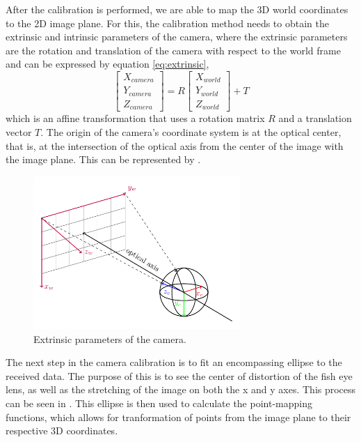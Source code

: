 After the calibration is performed, we are able to map the 3D world coordinates to the 2D image plane. For this, the calibration method needs to obtain the extrinsic
and intrinsic parameters of the camera, where the extrinsic parameters are the rotation and translation of the camera with respect to the world frame and can be expressed by equation \ref{eq:extrinsic},
\begin{equation}
	\begin{bmatrix}
		X_{camera} \\
		Y_{camera} \\
		Z_{camera}
	\end{bmatrix}
	= R 
  \begin{bmatrix}
	X_{world} \\
	Y_{world} \\
	Z_{world}
  \end{bmatrix}
  + T
  \label{eq:extrinsic}
\end{equation}
which is an affine transformation that uses a rotation matrix $R$ and a translation vector $T$. The origin of the camera's coordinate system is at the optical center,
that is, at the intersection of the optical axis from the center of the image with the image plane. This can be represented by .

\begin{figure}[H]
  \centering
  \includegraphics[width=0.7\textwidth]{./fig/tikz/extrinsic.pdf}
  \caption{Extrinsic parameters of the camera.}
  \label{fig:camera_extrinsic}
\end{figure}

The next step in the camera calibration is to fit an encompassing ellipse to the received data. The purpose of this is to see the center of distortion of the fish eye lens, as well
as the stretching of the image on both the x and y axes. This process can be seen in . This ellipse is then used to calculate the point-mapping functions, which allows for tranformation of points from
the image plane to their respective 3D coordinates.


